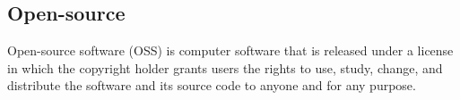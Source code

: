 \section{}

\subsection*{Open-source}
Open-source software (OSS) is computer software that is released under a license in which the copyright holder grants users the rights to use, study, change, and distribute the software and its source code to anyone and for any purpose.